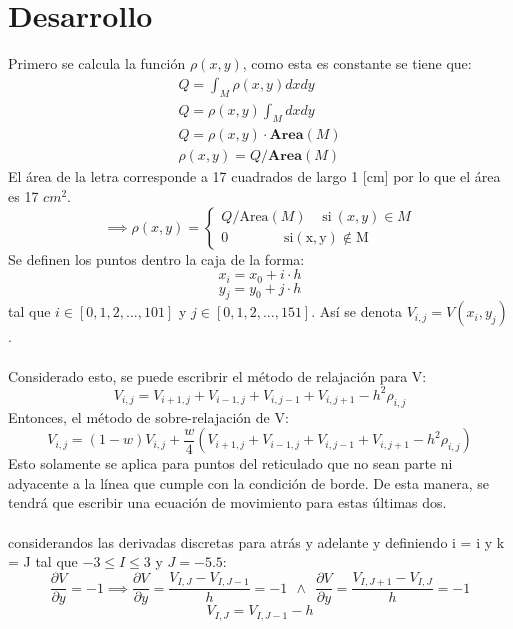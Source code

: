 \documentclass[letterpaper,oneside]{article}
\begin{document}
\section{Desarrollo}
Primero se calcula la función $\rho(x,y)$, como esta es constante se tiene que:
$$ \begin{matrix}\displaystyle  
 Q = \int_{M} \rho(x,y)dxdy \\    
\displaystyle Q = \rho(x,y) \int_M dxdy  \\ 
Q = \rho(x,y)\cdot \mathbf{Area}(M)\\
\rho(x,y)=Q/\mathbf{Area}(M)
\end{matrix}
 $$
 El  área de la letra corresponde a 17 cuadrados de largo 1 [cm] por lo que el área es 17 $cm^2$.
\begin{equation}
    \implies \rho(x,y)=\left\{\begin{matrix}
Q/\mathrm{Area}(M)~~~~~\mathrm{si}~(x,y)\in M\\
0 ~~~~~~~~~~~~~~~~~~\mathrm{si (x,y)\notin M } 

\end{matrix}\right.
\end{equation}
Se definen los puntos dentro la caja de la forma:
$$ x_i = x_0+i\cdot h$$
$$ y_j = y_0+j\cdot h$$
tal que $i \in [0, 1, 2, ..., 101]$ y $j \in [0, 1, 2,..., 151]$. Así se denota $V_{i,j}=V(x_i, y_j)$. \\ \\
Considerado esto, se puede escribrir el método de relajación para V:
\begin{equation}
   V_{i,j}=V_{i+1,j}+V_{i-1,j}+V_{i,j-1}+V_{i,j+1}-h^2\rho_{i,j} 
   \label{metodo de relajacion}
\end{equation}
Entonces, el método de sobre-relajación de V: 
\begin{equation}
    V_{i,j}=(1-w)V_{i,j}+ \frac{w}{4}(V_{i+1,j}+V_{i-1,j}+V_{i,j-1}+V_{i,j+1}-h^2\rho_{i,j}) 
\end{equation}
Esto solamente se aplica para puntos del reticulado que no sean parte ni adyacente a la línea que cumple con la condición de borde. De esta manera, se tendrá que escribir una ecuación de movimiento para estas últimas dos.\\ \\
considerandos las derivadas discretas para atrás y adelante y definiendo i = i y k = J tal que $-3 \leq I \leq 3$ y $J=-5.5$:
$$ \frac{\partial V}{\partial y}=-1 \implies \frac{\partial V}{\partial y}=\frac{V_{I,J}-V_{I,J-1}}{h}=-1~~\wedge ~~ \frac{\partial V}{\partial y}=\frac{V_{I,J+1}-V_{I,J}}{h} =-1 $$
\begin{equation}
V_{I,J}=V_{I,J-1}-h    
\label{derivada pa atras}
\end{equation}
\end{document}
